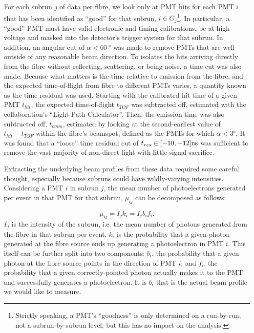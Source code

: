 For each subrun $j$ of data per fibre, we look only at PMT hits for each PMT $i$ that has been identified as ``good'' for that subrun, $i \in G_{j}$\footnote{Strictly speaking, a PMT's ``goodness'' is only determined on a run-by-run, not a subrun-by-subrun level, but this has no impact on the analysis.}. In particular, a ``good'' PMT must have valid electronic and timing calibrations, be at high voltage and masked into the detector's trigger system for that subrun. In addition, an angular cut of $\alpha < \SI{60}{\degree}$ was made to remove PMTs that are well outside of any reasonable beam direction. To isolates the hits arriving directly from the fibre without reflecting, scattering, or being noise, a time cut was also made. Because what matters is the time relative to emission from the fibre, and the expected time-of-flight from fibre to different PMTs varies, a quantity known as the time residual was used. Starting with the calibrated hit time of a given PMT $t_{hit}$, the expected time-of-flight $t_{TOF}$ was subtracted off, estimated with the collaboration's ``Light Path Calculator''. Then, the emission time was also subtracted off, $t_{emm}$, estimated by looking at the second-earliest value of $t_{hit}-t_{TOF}$ within the fibre's beamspot, defined as the PMTs for which $\alpha<\ang{3}$. It was found that a ``loose'' time residual cut of $t_{res} \in [-10, +12] \si[]{\nano\second}$ was sufficient to remove the vast majority of non-direct light with little signal sacrifice.

Extracting the underlying beam profiles from these data required some careful thought, especially because subruns could have wildly-varying intensities. Considering a PMT $i$ in subrun $j$, the mean number of photoelectrons generated per event in that PMT for that subrun, $\mu_{ij}$ can be decomposed as follows:

\begin{equation}\label{eq:mu_def}
    \mu_{ij} = I_{j}k_{i} = I_{j}b_{i}f_{i}.
\end{equation}
$I_{j}$ is the intensity of the subrun, i.e. the mean number of photons generated from the fibre in that subrun per event. $k_{i}$ is the probability that a given photon generated at the fibre source ends up generating a photoelectron in PMT $i$. This itself can be further split into two components: $b_{i}$, the probability that a given photon at the fibre source points in the direction of PMT $i$; and $f_{i}$, the probability that a given correctly-pointed photon actually makes it to the PMT and successfully generates a photoelectron. It is $b_{i}$ that is the actual beam profile we would like to measure.

